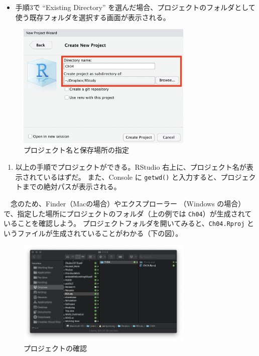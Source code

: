 \documentclass[
  a4paper,
  pandoc,
  ja=standard,
  jafont=haranoaji]{bxjsbook}
\providecommand{\tightlist}{%
  \setlength{\itemsep}{0pt}\setlength{\parskip}{0pt}}
\begin{document}
\begin{itemize}
\tightlist
\item
  手順3で ``Existing Directory''
  を選んだ場合、プロジェクトのフォルダとして使う既存フォルダを選択する画面が表示される。
\end{itemize}

\begin{figure}

{\centering \includegraphics[width=0.75\textwidth,height=\textheight]{./Figs/Rbasic/Project4.png}

}

\caption{\label{fig-rbasic_project4}プロジェクト名と保存場所の指定}

\end{figure}

\begin{enumerate}
\def\labelenumi{\arabic{enumi}.}
\setcounter{enumi}{5}
\tightlist
\item
  以上の手順でプロジェクトができる。RStudio
  右上に、プロジェクト名が表示されているはずだ。 また、Console に
  \texttt{getwd()}
  と入力すると、プロジェクトまでの絶対パスが表示される。
\end{enumerate}

　念のため、Finder（Macの場合）やエクスプローラー （Windows
の場合）で、指定した場所にプロジェクトのフォルダ（上の例では
\texttt{Ch04}）が生成されていることを確認しよう。
プロジェクトフォルダを開いてみると、\texttt{Ch04.Rproj}
というファイルが生成されていることがわかる（下の図）。

\begin{figure}

{\centering \includegraphics[width=0.75\textwidth,height=\textheight]{./Figs/Rbasic/Project5.png}

}

\caption{\label{fig-rbasic_project5}プロジェクトの確認}

\end{figure}
\end{document}
